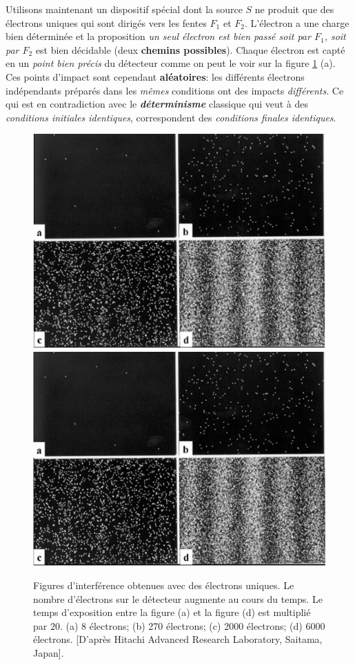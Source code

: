 Utilisons maintenant un dispositif spécial dont la source $S$ ne produit que des
électrons uniques qui sont dirigés vers les fentes $F_1$ et $F_2$.
L'électron a une charge bien déterminée et la proposition \emph{un seul électron
est bien passé soit par $F_1$, soit par $F_2$} est bien décidable (deux
\textbf{chemins possibles}). Chaque électron est capté en un \emph{point bien
précis} du détecteur comme on peut le voir sur la figure \ref{fig:InterfPhotons}
(a). Ces points d'impact sont cependant \textbf{aléatoires}: les différents
électrons indépendants préparés dans les \emph{mêmes} conditions ont des impacts
\emph{différents}. Ce qui est en contradiction avec le
\textbf{\emph{déterminisme}} classique qui veut à des \emph{conditions initiales
identiques}, correspondent des \emph{conditions finales identiques}.

\begin{figure}[htbp]
\centering
\ifcase\msipdfoutput
  \includegraphics[scale=1]{graphics/InterfPhotons.eps}%
\else
  \includegraphics[scale=1]{graphics/InterfPhotons.pdf}%
\fi
\caption{Figures d'interférence obtenues avec des électrons uniques. Le nombre
d'électrons sur le détecteur augmente au cours du temps. Le temps d'exposition
entre la figure (a) et la figure (d) est multiplié par $20$. (a) 8 électrons;
(b) 270 électrons; (c) 2000 électrons; (d) 6000 électrons. [D'après Hitachi
Advanced Research Laboratory, Saitama, Japan].}%
\label{fig:InterfPhotons}%
\end{figure}

